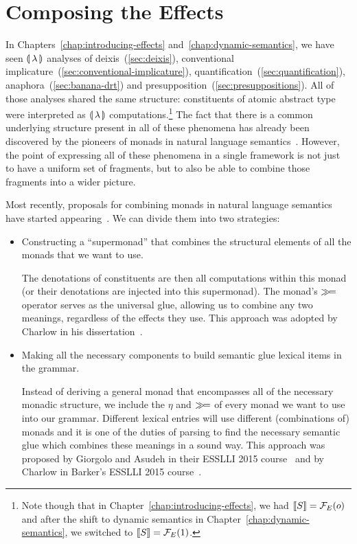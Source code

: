 \chapter{Composing the Effects}
\label{chap:composing-effects}

In Chapters~\ref{chap:introducing-effects}
and~\ref{chap:dynamic-semantics}, we have seen ${\llparenthesis \, \lambda \, \rrparenthesis}$ analyses of
deixis~(\ref{sec:deixis}), conventional
implicature~(\ref{sec:conventional-implicature}),
quantification~(\ref{sec:quantification}), anaphora~(\ref{sec:banana-drt})
and presupposition~(\ref{sec:presuppositions}). All of those analyses
shared the same structure: constituents of atomic abstract type were
interpreted as ${\llparenthesis \, \lambda \, \rrparenthesis}$ computations.\footnote{Note though that in
  Chapter~\ref{chap:introducing-effects}, we had $\llbracket S \rrbracket = \mathcal{F}_E(o)$ and
  after the shift to dynamic semantics in
  Chapter~\ref{chap:dynamic-semantics}, we switched to
  $\llbracket S \rrbracket = \mathcal{F}_E(1)$.} The fact that there is a common underlying
structure present in all of these phenomena has already been discovered by
the pioneers of monads in natural language
semantics~\cite{shan2002monads,charlow2014semantics,giorgolo2015natural,barker2015monads}. However,
the point of expressing all of these phenomena in a single framework is not
just to have a uniform set of fragments, but to also be able to combine
those fragments into a wider picture.

Most recently, proposals for combining monads in natural language semantics
have started
appearing~\cite{charlow2014semantics,giorgolo2015natural,barker2015monads}. We
can divide them into two strategies:

\begin{itemize}
\item Constructing a ``supermonad'' that combines the structural elements
  of all the monads that we want to use.

  The denotations of constituents are then all computations within this
  monad (or their denotations are injected into this supermonad). The
  monad's $\mathbin{\gg\!=}$ operator serves as the universal glue, allowing us to
  combine any two meanings, regardless of the effects they use. This
  approach was adopted by Charlow in his
  dissertation~\cite{charlow2014semantics}.
\item Making all the necessary components to build semantic glue lexical
  items in the grammar.

  Instead of deriving a general monad that encompasses all of the necessary
  monadic structure, we include the $\eta$ and $\mathbin{\gg\!=}$ of every monad we
  want to use into our grammar. Different lexical entries will use
  different (combinations of) monads and it is one of the duties of parsing
  to find the necessary semantic glue which combines these meanings in a
  sound way. This approach was proposed by Giorgolo and Asudeh in their
  ESSLLI 2015 course~\cite{giorgolo2015natural} and by Charlow in Barker's
  ESSLLI 2015 course~\cite{barker2015monads,charlow2015monads}.
\end{itemize}


